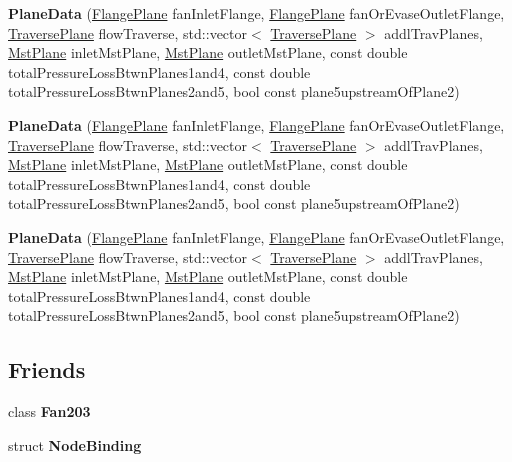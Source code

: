 \begin{DoxyCompactItemize}
\item 
\mbox{\label{class_plane_data_a1ad5393fae6978e34f15d315b03f5525}} 
{\bfseries Plane\+Data} (\hyperlink{class_flange_plane}{Flange\+Plane} fan\+Inlet\+Flange, \hyperlink{class_flange_plane}{Flange\+Plane} fan\+Or\+Evase\+Outlet\+Flange, \hyperlink{class_traverse_plane}{Traverse\+Plane} flow\+Traverse, std\+::vector$<$ \hyperlink{class_traverse_plane}{Traverse\+Plane} $>$ addl\+Trav\+Planes, \hyperlink{class_mst_plane}{Mst\+Plane} inlet\+Mst\+Plane, \hyperlink{class_mst_plane}{Mst\+Plane} outlet\+Mst\+Plane, const double total\+Pressure\+Loss\+Btwn\+Planes1and4, const double total\+Pressure\+Loss\+Btwn\+Planes2and5, bool const plane5upstream\+Of\+Plane2)
\item 
\mbox{\label{class_plane_data_a1ad5393fae6978e34f15d315b03f5525}} 
{\bfseries Plane\+Data} (\hyperlink{class_flange_plane}{Flange\+Plane} fan\+Inlet\+Flange, \hyperlink{class_flange_plane}{Flange\+Plane} fan\+Or\+Evase\+Outlet\+Flange, \hyperlink{class_traverse_plane}{Traverse\+Plane} flow\+Traverse, std\+::vector$<$ \hyperlink{class_traverse_plane}{Traverse\+Plane} $>$ addl\+Trav\+Planes, \hyperlink{class_mst_plane}{Mst\+Plane} inlet\+Mst\+Plane, \hyperlink{class_mst_plane}{Mst\+Plane} outlet\+Mst\+Plane, const double total\+Pressure\+Loss\+Btwn\+Planes1and4, const double total\+Pressure\+Loss\+Btwn\+Planes2and5, bool const plane5upstream\+Of\+Plane2)
\item 
\mbox{\label{class_plane_data_a1ad5393fae6978e34f15d315b03f5525}} 
{\bfseries Plane\+Data} (\hyperlink{class_flange_plane}{Flange\+Plane} fan\+Inlet\+Flange, \hyperlink{class_flange_plane}{Flange\+Plane} fan\+Or\+Evase\+Outlet\+Flange, \hyperlink{class_traverse_plane}{Traverse\+Plane} flow\+Traverse, std\+::vector$<$ \hyperlink{class_traverse_plane}{Traverse\+Plane} $>$ addl\+Trav\+Planes, \hyperlink{class_mst_plane}{Mst\+Plane} inlet\+Mst\+Plane, \hyperlink{class_mst_plane}{Mst\+Plane} outlet\+Mst\+Plane, const double total\+Pressure\+Loss\+Btwn\+Planes1and4, const double total\+Pressure\+Loss\+Btwn\+Planes2and5, bool const plane5upstream\+Of\+Plane2)
\end{DoxyCompactItemize}
\subsection*{Friends}
\begin{DoxyCompactItemize}
\item 
\mbox{\label{class_plane_data_ad537df0087a4a6f474dc9d50579cc33d}} 
class {\bfseries Fan203}
\item 
\mbox{\label{class_plane_data_a9c01399c7976e2638c99aa7c4d25ac69}} 
struct {\bfseries Node\+Binding}
\end{DoxyCompactItemize}


